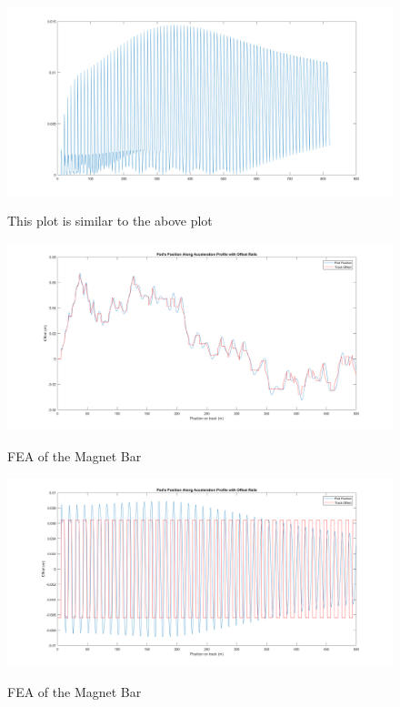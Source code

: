 \documentclass[main.tex]{subfiles}
\begin{document}
    \begin{figure}
        	\centering
        \includegraphics[width=\linewidth]{images/OscillatingMaxDistToRail}
        \label{fig:OMaxDistRail}
        \caption{This plot is similar to the above plot}
    \end{figure}
    
    
    \begin{figure}
    	\centering
        \includegraphics[width=\linewidth]{images/RandPodLateralResponse}
        \label{fig:RandpodLateralResponse}
        \caption{FEA of the Magnet Bar}
    \end{figure}
    \begin{figure}
    	\centering
        \includegraphics[width=\linewidth]{images/OscillatingPodLateralResponse}
        \label{fig:OPodLateralRespnse}
        \caption{FEA of the Magnet Bar}
    \end{figure}    
\end{document}
